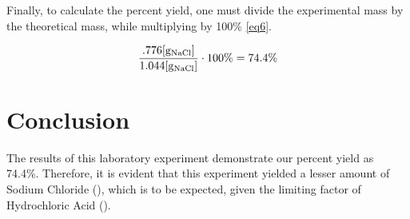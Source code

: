 \documentclass{article}
\begin{document}
\begin{justify}

  Finally, to calculate the percent yield, one must divide the experimental mass by the theoretical mass, while multiplying by 100\% \eqref{eq6}.

\begin{equation} \label{eq6}
  \frac{.776[\si{\gram}_{\ce{NaCl}}]}{1.044[\si{\gram}_{\ce{NaCl}}]} \cdot 100\% = 74.4\%
\end{equation}

\end{justify}

\section{Conclusion}

\begin{justify}

  The results of this laboratory experiment demonstrate our percent yield as 74.4\%. Therefore, it is evident that this experiment yielded a lesser amount of Sodium Chloride (), which is to be expected, given the limiting factor of Hydrochloric Acid (). 

\end{justify}
\end{document}
